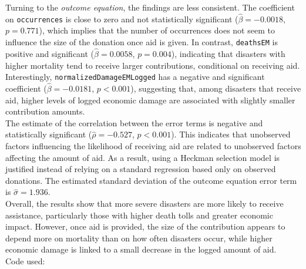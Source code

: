 \documentclass[12pt,letterpaper]{article}
\begin{document}
 \noindent Turning to the \textit{outcome equation}, the findings are less consistent. The coefficient on \texttt{occurrences} is close to zero and not statistically significant (\(\hat{\beta} = -0.0018\), \(p = 0.771\)), which implies that the number of occurrences does not seem to influence the size of the donation once aid is given. In contrast, \texttt{deathsEM} is positive and significant (\(\hat{\beta} = 0.0058\), \(p = 0.004\)), indicating that disasters with higher mortality tend to receive larger contributions, conditional on receiving aid. Interestingly, \texttt{normalizedDamageEMLogged} has a negative and significant coefficient (\(\hat{\beta} = -0.0181\), \(p < 0.001\)), suggesting that, among disasters that receive aid, higher levels of logged economic damage are associated with slightly smaller contribution amounts.\\
 
 \noindent The estimate of the correlation between the error terms is negative and statistically significant (\(\hat{\rho} = -0.527\), \(p < 0.001\)). This indicates that unobserved factors influencing the likelihood of receiving aid are related to unobserved factors affecting the amount of aid. As a result, using a Heckman selection model is justified instead of relying on a standard regression based only on observed donations. The estimated standard deviation of the outcome equation error term is \(\hat{\sigma} = 1.936\).\\
 
 \noindent Overall, the results show that more severe disasters are more likely to receive assistance, particularly those with higher death tolls and greater economic impact. However, once aid is provided, the size of the contribution appears to depend more on mortality than on how often disasters occur, while higher economic damage is linked to a small decrease in the logged amount of aid.\\
 
 Code used: 
 
 
\end{document}
